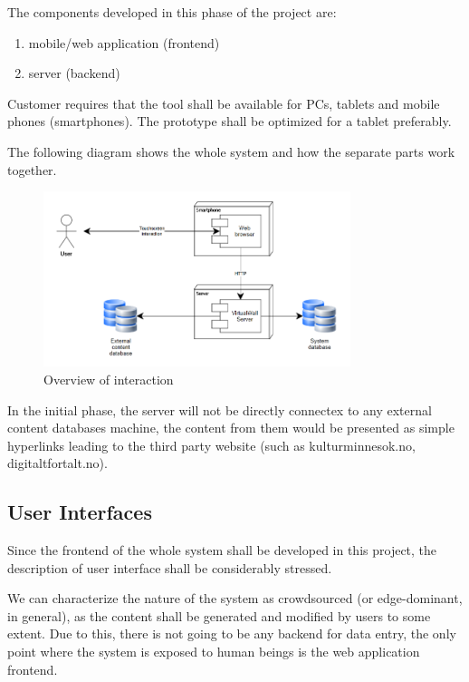 \documentclass[11pt]{book}
\begin{document}
The components developed in this phase of the project are:

\begin{enumerate}
  \item mobile/web application (frontend)
  \item server (backend)
\end{enumerate}

Customer requires that the tool shall be available for PCs, tablets and mobile phones (smartphones). The prototype shall be optimized for a tablet preferably.

The following diagram shows the whole system and how the separate parts work together.

\begin{figure}[H]
      \centering
      \includegraphics[width=0.8\textwidth]{Figures/Requirements/overview.png}
      \caption{Overview of interaction}
      \label{fig:req_overview}
\end{figure}

In the initial phase, the server will not be directly connectex to any external content databases machine, the content from them would be presented as simple hyperlinks leading to the third party website (such as kulturminnesok.no, digitaltfortalt.no).

\subsection{User Interfaces}
Since the frontend of the whole system shall be developed in this project, the description of user interface shall be considerably stressed.

We can characterize the nature of the system as crowdsourced (or edge-dominant, in general), as the content shall be generated and modified by users to some extent. Due to this, there is not going to be any backend for data entry, the only point where the system is exposed to human beings is the web application frontend.
\end{document}
